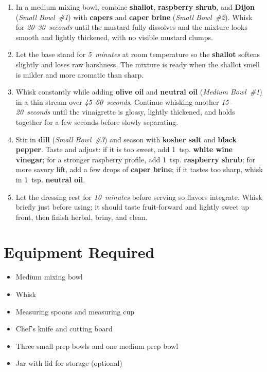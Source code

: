 \documentclass[11pt,letterpaper]{article}
\begin{document}
\begin{enumerate}
    \item In a medium mixing bowl, combine \textbf{shallot}, \textbf{raspberry shrub}, and \textbf{Dijon} (\textit{Small Bowl~\#1}) with \textbf{capers} and \textbf{caper brine} (\textit{Small Bowl~\#2}). Whisk for \textit{20--30~seconds} until the mustard fully dissolves and the mixture looks smooth and lightly thickened, with no visible mustard clumps.

    \item Let the base stand for \textit{5~minutes} at room temperature so the \textbf{shallot} softens slightly and loses raw harshness. The mixture is ready when the shallot smell is milder and more aromatic than sharp.

    \item Whisk constantly while adding \textbf{olive oil} and \textbf{neutral oil} (\textit{Medium Bowl~\#1}) in a thin stream over \textit{45--60~seconds}. Continue whisking another \textit{15--20~seconds} until the vinaigrette is glossy, lightly thickened, and holds together for a few seconds before slowly separating.

    \item Stir in \textbf{dill} (\textit{Small Bowl~\#3}) and season with \textbf{kosher salt} and \textbf{black pepper}. Taste and adjust: if it is too sweet, add 1~tsp. \textbf{white wine vinegar}; for a stronger raspberry profile, add 1~tsp. \textbf{raspberry shrub}; for more savory lift, add a few drops of \textbf{caper brine}; if it tastes too sharp, whisk in 1~tsp. \textbf{neutral oil}.

    \item Let the dressing rest for \textit{10~minutes} before serving so flavors integrate. Whisk briefly just before using; it should taste fruit-forward and lightly sweet up front, then finish herbal, briny, and clean.
\end{enumerate}

\newpage

\section*{Equipment Required}
\begin{itemize}
    \item Medium mixing bowl
    \item Whisk
    \item Measuring spoons and measuring cup
    \item Chef's knife and cutting board
    \item Three small prep bowls and one medium prep bowl
    \item Jar with lid for storage (optional)
\end{itemize}
\end{document}
